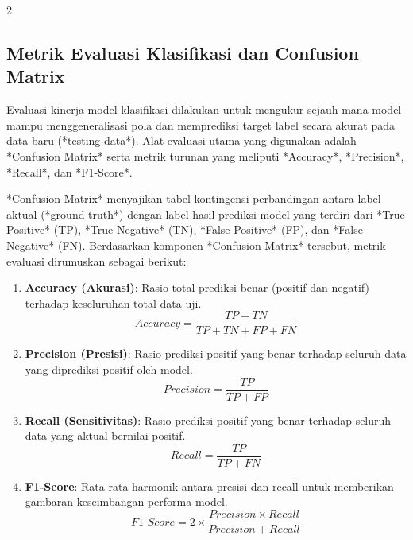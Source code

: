 \documentclass[12pt, a4paper, onecolumn, oneside]{report}
\begin{document}
\begin{spacing}{2}
\subsection{Metrik Evaluasi Klasifikasi dan Confusion Matrix}
Evaluasi kinerja model klasifikasi dilakukan untuk mengukur sejauh mana model mampu menggeneralisasi pola dan memprediksi target label secara akurat pada data baru (*testing data*). Alat evaluasi utama yang digunakan adalah *Confusion Matrix* serta metrik turunan yang meliputi *Accuracy*, *Precision*, *Recall*, dan *F1-Score*.

*Confusion Matrix* menyajikan tabel kontingensi perbandingan antara label aktual (*ground truth*) dengan label hasil prediksi model yang terdiri dari *True Positive* (TP), *True Negative* (TN), *False Positive* (FP), dan *False Negative* (FN). Berdasarkan komponen *Confusion Matrix* tersebut, metrik evaluasi dirumuskan sebagai berikut:

\begin{enumerate}
    \item \textbf{Accuracy (Akurasi)}: Rasio total prediksi benar (positif dan negatif) terhadap keseluruhan total data uji.
    \begin{equation}
        Accuracy = \frac{TP + TN}{TP + TN + FP + FN}
    \end{equation}

    \item \textbf{Precision (Presisi)}: Rasio prediksi positif yang benar terhadap seluruh data yang diprediksi positif oleh model.
    \begin{equation}
        Precision = \frac{TP}{TP + FP}
    \end{equation}

    \item \textbf{Recall (Sensitivitas)}: Rasio prediksi positif yang benar terhadap seluruh data yang aktual bernilai positif.
    \begin{equation}
        Recall = \frac{TP}{TP + FN}
    \end{equation}

    \item \textbf{F1-Score}: Rata-rata harmonik antara presisi dan recall untuk memberikan gambaran keseimbangan performa model.
    \begin{equation}
        F1\text{-}Score = 2 \times \frac{Precision \times Recall}{Precision + Recall}
    \end{equation}
\end{enumerate}



\end{spacing}
\end{document}
